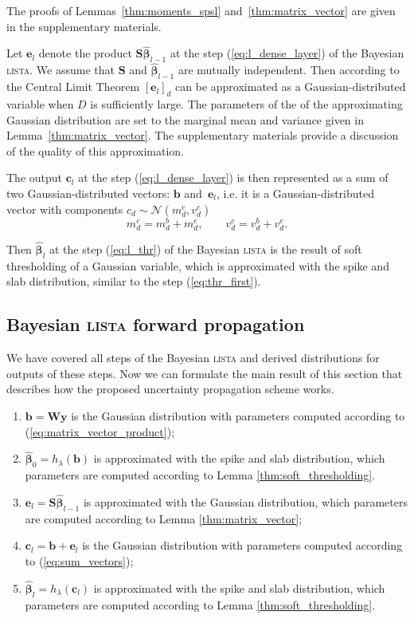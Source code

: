 \documentclass{article}
\begin{document}
The proofs of Lemmas~\ref{thm:moments_spsl} and~\ref{thm:matrix_vector} are given in the supplementary materials.

Let $\mathbf{e}_l$ denote the product $\mathbf{S}\widehat{\boldsymbol\beta}_{l-1}$ at the step (\ref{eq:l_dense_layer}) of the Bayesian \textsc{lista}. We assume that $\mathbf{S}$ and $\widehat{\boldsymbol\beta}_{l-1}$ are mutually independent. Then according to the Central Limit Theorem $[ \mathbf{e}_l ]_d$ can be approximated as a Gaussian-distributed variable when $D$ is sufficiently large. The parameters of the of the approximating Gaussian distribution are set to the marginal mean and variance given in Lemma~\ref{thm:matrix_vector}. The supplementary materials provide a discussion of the quality of this approximation.

The output $\mathbf{c}_l$ at the step (\ref{eq:l_dense_layer}) is then represented as a sum of two Gaussian-distributed vectors: $\mathbf{b}$ and~$\mathbf{e}_l$, i.e. it is a Gaussian-distributed vector with components $c_{d} \sim \mathcal{N}(m^c_{d}, v^c_{d})$
\begin{equation}
\label{eq:sum_vectors}
m^c_{d} = m^b_{d} + m^e_{d}, \qquad
v^c_{d} = v^b_{d} + v^e_{d}.
\end{equation}


Then $\widehat{\boldsymbol\beta}_{l}$ at the step (\ref{eq:l_thr}) of the Bayesian \textsc{lista} is the result of soft thresholding of a Gaussian variable, which is approximated with the spike and slab distribution,  similar to the step (\ref{eq:thr_first}).

\subsection{Bayesian \textsc{lista} forward propagation}
We have covered all steps of the Bayesian \textsc{lista} and derived distributions for outputs of these steps. Now we can formulate the main result of this section that describes how the proposed uncertainty propagation scheme works.

\begin{enumerate}
	\item $\mathbf{b} = \mathbf{W}\mathbf{y}$ is the Gaussian distribution with parameters computed according to (\ref{eq:matrix_vector_product});
	\item $\widehat{\boldsymbol\beta}_{0} = h_\lambda(\mathbf{b})$ is approximated with the spike and slab distribution, which parameters are computed according to Lemma \ref{thm:soft_thresholding}.
	\item $\mathbf{e}_l = \mathbf{S}\widehat{\boldsymbol\beta}_{l-1}$ is approximated with the Gaussian distribution, which parameters are computed according to Lemma \ref{thm:matrix_vector};
	\item $\mathbf{c}_l = \mathbf{b} + \mathbf{e}_l$ is the Gaussian distribution with parameters computed according to (\ref{eq:sum_vectors});
	\item $\widehat{\boldsymbol\beta}_{l} = h_\lambda(\mathbf{c}_l)$ is approximated with the spike and slab distribution, which parameters are computed according to Lemma \ref{thm:soft_thresholding}.
\end{enumerate}
\end{document}

